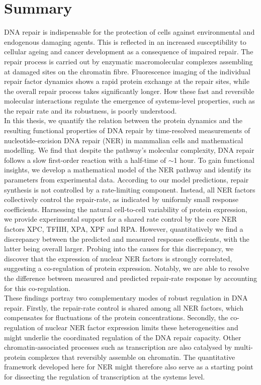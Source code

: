 \chapter*{Summary}
\thispagestyle{plain2}





DNA repair is indispensable for the protection of cells against environmental and endogenous damaging agents. This is reflected in an increased susceptibility to cellular ageing and cancer development as a consequence of impaired repair. The repair process is carried out by enzymatic macromolecular complexes assembling at damaged sites on the chromatin fibre. Fluorescence imaging of the individual repair factor dynamics shows a rapid protein exchange at the repair sites, while the overall repair process takes significantly longer. How these fast and reversible molecular interactions regulate the emergence of systems-level properties, such as the repair rate and its robustness, is poorly understood.\\ 
In this thesis, we quantify the relation between the protein dynamics and the resulting functional properties of DNA repair by time-resolved measurements of nucleotide-excision DNA repair (NER) in mammalian cells and mathematical modelling. We find that despite the pathway's molecular complexity, DNA repair follows a slow first-order reaction with a half-time of $\sim$1 hour. To gain functional insights, we develop a mathematical model of the NER pathway and identify its parameters from experimental data. According to our model predictions, repair synthesis is not controlled by a rate-limiting component. Instead, all NER factors collectively control the repair-rate, as indicated by uniformly small response coefficients. Harnessing the natural cell-to-cell variability of protein expression, we provide experimental support for a shared rate control by the core NER factors XPC, TFIIH, XPA, XPF and RPA. However, quantitatively we find a discrepancy between the predicted and measured response coefficients, with the latter being overall larger. Probing into the causes for this discrepancy, we discover that the expression of nuclear NER factors is strongly correlated, suggesting a co-regulation of protein expression. Notably, we are able to resolve the difference between measured and predicted repair-rate response by accounting for this co-regulation. \\ 
These findings portray two complementary modes of robust regulation in DNA repair. Firstly, the repair-rate control is shared among all NER factors, which compensates for fluctuations of the protein concentrations. Secondly, the co-regulation of nuclear NER factor expression limits these heterogeneities and might underlie the coordinated regulation of the DNA repair capacity. Other chromatin-associated processes such as transcription are also catalysed by multi-protein complexes that reversibly assemble on chromatin. The quantitative framework developed here for NER might therefore also serve as a starting point for dissecting the regulation of transcription at the systems level.



      
 


%